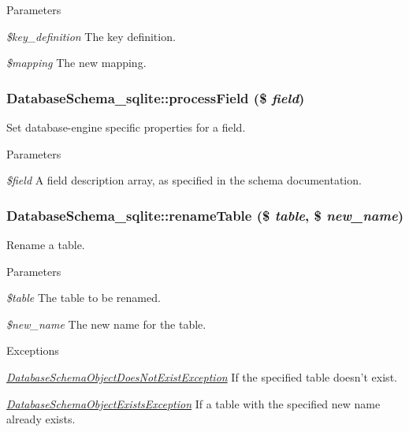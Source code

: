 \begin{DoxyParams}{Parameters}
\item[{\em \$key\_\-definition}]The key definition. \item[{\em \$mapping}]The new mapping. \end{DoxyParams}
\hypertarget{classDatabaseSchema__sqlite_a3017c0fafd2330a51fe89159c16cd071}{
\subsubsection[{processField}]{\setlength{\rightskip}{0pt plus 5cm}DatabaseSchema\_\-sqlite::processField (\$ {\em field})}}
\label{classDatabaseSchema__sqlite_a3017c0fafd2330a51fe89159c16cd071}
Set database-\/engine specific properties for a field.


\begin{DoxyParams}{Parameters}
\item[{\em \$field}]A field description array, as specified in the schema documentation. \end{DoxyParams}
\hypertarget{classDatabaseSchema__sqlite_a3ca3d490665805d43e6c143b90de0cf9}{
\subsubsection[{renameTable}]{\setlength{\rightskip}{0pt plus 5cm}DatabaseSchema\_\-sqlite::renameTable (\$ {\em table}, \/  \$ {\em new\_\-name})}}
\label{classDatabaseSchema__sqlite_a3ca3d490665805d43e6c143b90de0cf9}
Rename a table.


\begin{DoxyParams}{Parameters}
\item[{\em \$table}]The table to be renamed. \item[{\em \$new\_\-name}]The new name for the table.\end{DoxyParams}

\begin{DoxyExceptions}{Exceptions}
\item[{\em \hyperlink{classDatabaseSchemaObjectDoesNotExistException}{DatabaseSchemaObjectDoesNotExistException}}]If the specified table doesn't exist. \item[{\em \hyperlink{classDatabaseSchemaObjectExistsException}{DatabaseSchemaObjectExistsException}}]If a table with the specified new name already exists. \end{DoxyExceptions}


